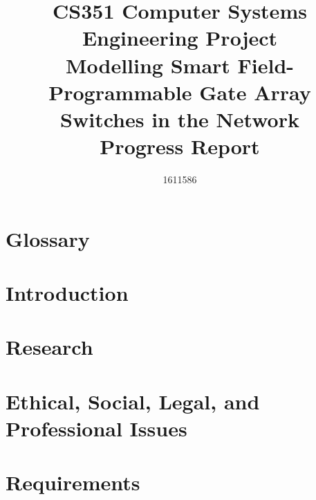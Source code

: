 \documentclass[
  12pt,
  a4paper,
  twoside,
  onecolumn,
  appendixprefix=true,
  toc=chapterentrywithdots,
  toc=bibliography,
  abstract=true,
  toc=listof
]{scrreprt}
\title{CS351 Computer Systems Engineering Project \\ \vspace{0.5cm} Modelling Smart Field-Programmable Gate Array Switches in the Network \\ \vspace{0.3cm} \Large{Progress Report}}
\author{1611586}
\begin{document}
\renewcommand{\sfdefault}{cmr}




\onehalfspacing
{}

\begin{abstract}
  
\end{abstract}

\let\oldcleardoublepage\cleardoublepage
\let\cleardoublepage\clearpage

\renewcommand{\abstractname}{Acknowledgements}
\begin{abstract}
  
\end{abstract}
\let\cleardoublepage\oldcleardoublepage

{}
\chapter*{Glossary}
\label{glossary}


\tableofcontents

\listoffigures

\listoftables

\newpage


\chapter{Introduction}
\label{introduction}


\chapter{Research}
\label{research}


\chapter{Ethical, Social, Legal, and Professional Issues}
\label{issues}


\chapter{Requirements}
\label{requirements}

\end{document}
